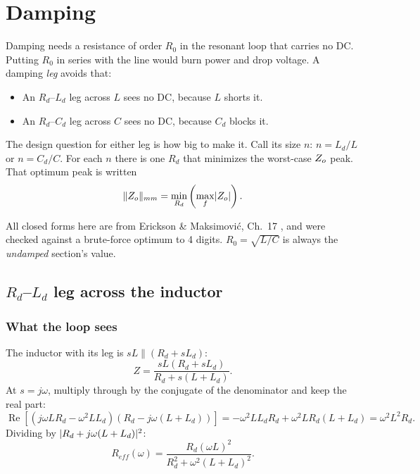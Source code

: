 \chapter{Damping}
\label{ch:damping}

\begin{idea}
	Damping needs a resistance of order $R_0$ in the resonant loop that carries
	no DC. Putting $R_0$ in series with the line would burn power and drop
	voltage. A damping \emph{leg} avoids that:
	\begin{itemize}
		\item An $R_d$--$L_d$ leg across $L$ sees no DC, because $L$ shorts it.
		\item An $R_d$--$C_d$ leg across $C$ sees no DC, because $C_d$ blocks it.
	\end{itemize}
\end{idea}

The design question for either leg is how big to make it. Call its size
$n$: $n = L_d/L$ or $n = C_d/C$. For each $n$ there is one $R_d$ that
minimizes the worst-case $Z_o$ peak. That optimum peak is written
\[
	\lVert Z_o\rVert_{mm} = \min_{R_d}\left(\max_f \lvert Z_o\rvert\right).
\]

All closed forms here are from Erickson \& Maksimovi\'c, Ch.~17
\cite{erickson}, and were checked against a brute-force optimum to 4 digits.
$R_0 = \sqrt{L/C}$ is always the \emph{undamped} section's value.


\section{\texorpdfstring{$R_d$--$L_d$}{Rd-Ld} leg across the inductor}
\label{sec:rd-ld}

\subsection{What the loop sees}

\begin{derivation}
	The inductor with its leg is $sL \parallel (R_d + sL_d)$:
	\[
		Z = \frac{sL(R_d + sL_d)}{R_d + s(L + L_d)}.
	\]
	At $s = j\omega$, multiply through by the conjugate of the denominator
	and keep the real part:
	\[
		\operatorname{Re}\left[(j\omega L R_d - \omega^2 L L_d)(R_d - j\omega(L + L_d))\right]
		= -\omega^2 L L_d R_d + \omega^2 L R_d (L + L_d) = \omega^2 L^2 R_d.
	\]
	Dividing by $\lvert R_d + j\omega(L+L_d)\rvert^2$:
	\begin{equation}\label{eq:reff}
		R_{eff}(\omega) = \frac{R_d(\omega L)^2}{R_d^2 + \omega^2(L + L_d)^2}.
	\end{equation}
\end{derivation}

